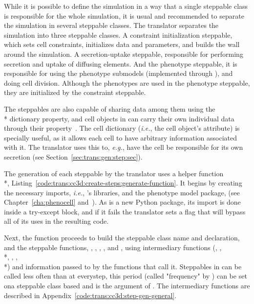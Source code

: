 While it is possible to define the simulation in a way that a single steppable class is responsible for the whole simulation, it is usual and recommended to separate the simulation in several steppable classes. %
The translator separates the simulation into three steppable classes. A constraint initialization steppable, which sets cell constraints, initializes data and parameters, and builds the wall around the simulation. A secretion-uptake steppable, responsible for performing secretion and uptake of diffusing elements. And the phenotype steppable, it is responsible for using the phenotype submodels (implemented through \pcp), and doing cell division. Although the phenotypes are used in the phenotype steppable, they are initialized by the constraint steppable.

The steppables are also capable of sharing data among them using the\\* dictionary property, and cell objects in \ccds can carry their own individual data through their  property~\cite{cc3d_python_scripting_manual}. The cell dictionary (\textit{i.e.}, the cell object's  attribute) is specially useful, as it allows each cell to have arbitrary information associated with it. The translator uses this to, \textit{e.g.}, have the cell be responsible for its own secretion (see Section~\ref{sec:trans:gen:step:sec}).

The generation of each steppable by the translator uses a helper function\\*, Listing~\ref{code:trans:cc3d:create-steps:generate-function}. It begins by creating the necessary imports, \textit{i.e.}, \ccd's libraries, and the phenotype model package, \pcps (see Chapter~\ref{cha:phenocell} and~\cite{gianlupi_phenocellpy_2023}). As \pcps is a new Python package, its import is done inside a try-except block, and if it fails the translator sets a flag that will bypass all of its uses in the resulting code.

Next, the function proceeds to build the steppable class name and declaration, and the steppable functions, , , , , and , using intermediary functions (, , \\*, , , \\*) and information passed to  by the functions that call it. Steppables in \ccds can be called less often than at everystep, this period (called "frequency" by \ccd) can be set ona steppable class based and is the  argument of . The intermediary functions are described in Appendix~\ref{code:trans:cc3d:step-gen-general}.

